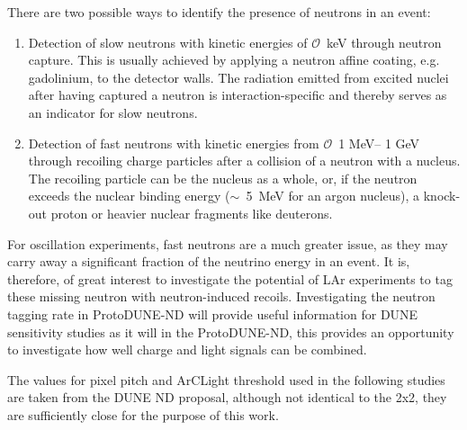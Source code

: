 There are two possible ways to identify the presence of neutrons in an event:
\begin{enumerate}
\item Detection of slow neutrons with kinetic energies of $\mathcal{O}$~keV through neutron capture. This is usually achieved by applying a neutron affine coating, e.g. gadolinium, to the detector walls. The radiation emitted from excited nuclei after having captured a neutron is interaction-specific and thereby serves as an indicator for slow neutrons.
\item Detection of fast neutrons with kinetic energies from $\mathcal{O}$~1 MeV-- 1 GeV through recoiling charge particles after a collision of a neutron with a nucleus. The recoiling particle can be the nucleus as a whole, or, if the neutron exceeds the nuclear binding energy ($\sim$~5~MeV for an argon nucleus), a knock-out proton or heavier nuclear fragments like deuterons.
\end{enumerate}
For oscillation experiments, fast neutrons are a much greater issue, as they may carry away a significant fraction of the neutrino energy in an event. It is, therefore, of great interest to investigate the potential of LAr experiments to tag these missing neutron with neutron-induced recoils. Investigating the neutron tagging rate in ProtoDUNE-ND will provide useful information for DUNE sensitivity studies as it will in the ProtoDUNE-ND, this provides an opportunity to investigate how well charge and light signals can be combined.

The values for pixel pitch and ArCLight threshold used in the following studies are taken from the DUNE ND proposal, although not identical to the 2x2, they are sufficiently close for the purpose of this work.  

